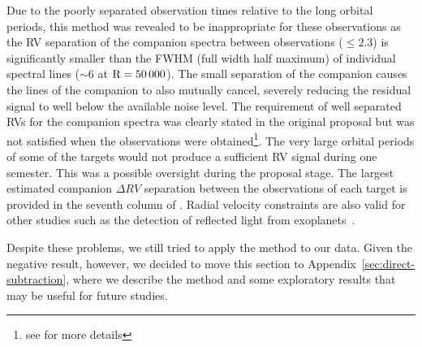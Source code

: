 Due to the poorly separated observation times relative to the long orbital periods, this method was revealed to be inappropriate for these observations as the {RV} separation of the companion spectra between observations (\(\le 2.3\)\kmps{}) is significantly smaller than the {FWHM} (full width half maximum) of individual spectral lines (\(\sim\)6\kmps{} at \(\rm R=50\,000\)).  The small separation of the companion causes the lines of the companion to also mutually cancel, severely reducing the residual signal to well below the available noise level. The requirement of well separated RVs for the companion spectra was clearly stated in the original proposal but was not satisfied when the observations were obtained\footnote{see  for more details}. {\red{} The very large orbital periods of some of the targets would not produce a sufficient {RV} signal during one semester. This was a possible oversight during the proposal stage.} The largest estimated companion \(\Delta {RV}\) separation between the observations of each target is provided in the seventh column of . Radial velocity constraints are also valid for other studies such as the detection of reflected light from exoplanets~\cite{martins_evidence_2015}.

{\red{} Despite these problems, we still tried to apply the method to our data. Given the negative result, however, we decided to move this section to Appendix~\ref{sec:direct-subtraction}, where we describe the method and some exploratory results that may be useful for future studies.
}


